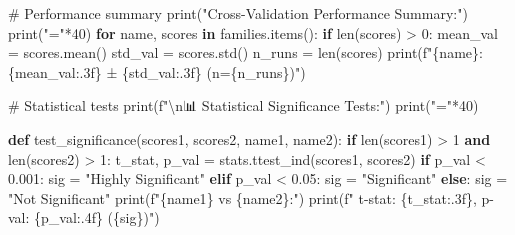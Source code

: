 \documentclass[
  letterpaper,
  DIV=11,
  numbers=noendperiod]{scrartcl}
\newenvironment{Shaded}{\begin{snugshade}}{\end{snugshade}}
\newcommand{\BuiltInTok}[1]{\textcolor[rgb]{0.00,0.23,0.31}{#1}}
\newcommand{\CharTok}[1]{\textcolor[rgb]{0.13,0.47,0.30}{#1}}
\newcommand{\CommentTok}[1]{\textcolor[rgb]{0.37,0.37,0.37}{#1}}
\newcommand{\ControlFlowTok}[1]{\textcolor[rgb]{0.00,0.23,0.31}{\textbf{#1}}}
\newcommand{\DecValTok}[1]{\textcolor[rgb]{0.68,0.00,0.00}{#1}}
\newcommand{\FloatTok}[1]{\textcolor[rgb]{0.68,0.00,0.00}{#1}}
\newcommand{\KeywordTok}[1]{\textcolor[rgb]{0.00,0.23,0.31}{\textbf{#1}}}
\newcommand{\NormalTok}[1]{\textcolor[rgb]{0.00,0.23,0.31}{#1}}
\newcommand{\OperatorTok}[1]{\textcolor[rgb]{0.37,0.37,0.37}{#1}}
\newcommand{\SpecialCharTok}[1]{\textcolor[rgb]{0.37,0.37,0.37}{#1}}
\newcommand{\SpecialStringTok}[1]{\textcolor[rgb]{0.13,0.47,0.30}{#1}}
\newcommand{\StringTok}[1]{\textcolor[rgb]{0.13,0.47,0.30}{#1}}
\renewenvironment{Shaded}{%
  \begin{tcolorbox}[%
    enhanced,%
    colback=codebg,%
    colframe=codebg,%
    borderline west={3pt}{0pt}{sectionblue},%
    fontupper=\small\ttfamily,%
    boxrule=0pt,%
    arc=0pt,%
    boxsep=5pt,%
    left=2mm,%
    right=2mm,%
    top=2mm,%
    bottom=2mm%
  ]%
}{%
  \end{tcolorbox}%
}
\begin{document}
\begin{Shaded}
\begin{Highlighting}[]
\CommentTok{\# Performance summary}
\BuiltInTok{print}\NormalTok{(}\StringTok{"Cross{-}Validation Performance Summary:"}\NormalTok{)}
\BuiltInTok{print}\NormalTok{(}\StringTok{"="}\OperatorTok{*}\DecValTok{40}\NormalTok{)}
\ControlFlowTok{for}\NormalTok{ name, scores }\KeywordTok{in}\NormalTok{ families.items():}
    \ControlFlowTok{if} \BuiltInTok{len}\NormalTok{(scores) }\OperatorTok{\textgreater{}} \DecValTok{0}\NormalTok{:}
\NormalTok{        mean\_val }\OperatorTok{=}\NormalTok{ scores.mean()}
\NormalTok{        std\_val }\OperatorTok{=}\NormalTok{ scores.std()}
\NormalTok{        n\_runs }\OperatorTok{=} \BuiltInTok{len}\NormalTok{(scores)}
        \BuiltInTok{print}\NormalTok{(}\SpecialStringTok{f"}\SpecialCharTok{\{}\NormalTok{name}\SpecialCharTok{\}}\SpecialStringTok{: }\SpecialCharTok{\{}\NormalTok{mean\_val}\SpecialCharTok{:.3f\}}\SpecialStringTok{ ± }\SpecialCharTok{\{}\NormalTok{std\_val}\SpecialCharTok{:.3f\}}\SpecialStringTok{ (n=}\SpecialCharTok{\{}\NormalTok{n\_runs}\SpecialCharTok{\}}\SpecialStringTok{)"}\NormalTok{)}

\CommentTok{\# Statistical tests}
\BuiltInTok{print}\NormalTok{(}\SpecialStringTok{f"}\CharTok{\textbackslash{}n}\SpecialStringTok{📊 Statistical Significance Tests:"}\NormalTok{)}
\BuiltInTok{print}\NormalTok{(}\StringTok{"="}\OperatorTok{*}\DecValTok{40}\NormalTok{)}

\KeywordTok{def}\NormalTok{ test\_significance(scores1, scores2, name1, name2):}
    \ControlFlowTok{if} \BuiltInTok{len}\NormalTok{(scores1) }\OperatorTok{\textgreater{}} \DecValTok{1} \KeywordTok{and} \BuiltInTok{len}\NormalTok{(scores2) }\OperatorTok{\textgreater{}} \DecValTok{1}\NormalTok{:}
\NormalTok{        t\_stat, p\_val }\OperatorTok{=}\NormalTok{ stats.ttest\_ind(scores1, scores2)}
        \ControlFlowTok{if}\NormalTok{ p\_val }\OperatorTok{\textless{}} \FloatTok{0.001}\NormalTok{:}
\NormalTok{            sig }\OperatorTok{=} \StringTok{"Highly Significant"}
        \ControlFlowTok{elif}\NormalTok{ p\_val }\OperatorTok{\textless{}} \FloatTok{0.05}\NormalTok{:}
\NormalTok{            sig }\OperatorTok{=} \StringTok{"Significant"} 
        \ControlFlowTok{else}\NormalTok{:}
\NormalTok{            sig }\OperatorTok{=} \StringTok{"Not Significant"}
        \BuiltInTok{print}\NormalTok{(}\SpecialStringTok{f"}\SpecialCharTok{\{}\NormalTok{name1}\SpecialCharTok{\}}\SpecialStringTok{ vs }\SpecialCharTok{\{}\NormalTok{name2}\SpecialCharTok{\}}\SpecialStringTok{:"}\NormalTok{)}
        \BuiltInTok{print}\NormalTok{(}\SpecialStringTok{f"  t{-}stat: }\SpecialCharTok{\{}\NormalTok{t\_stat}\SpecialCharTok{:.3f\}}\SpecialStringTok{, p{-}val: }\SpecialCharTok{\{}\NormalTok{p\_val}\SpecialCharTok{:.4f\}}\SpecialStringTok{ (}\SpecialCharTok{\{}\NormalTok{sig}\SpecialCharTok{\}}\SpecialStringTok{)"}\NormalTok{)}


\end{Highlighting}
\end{Shaded}
\end{document}

